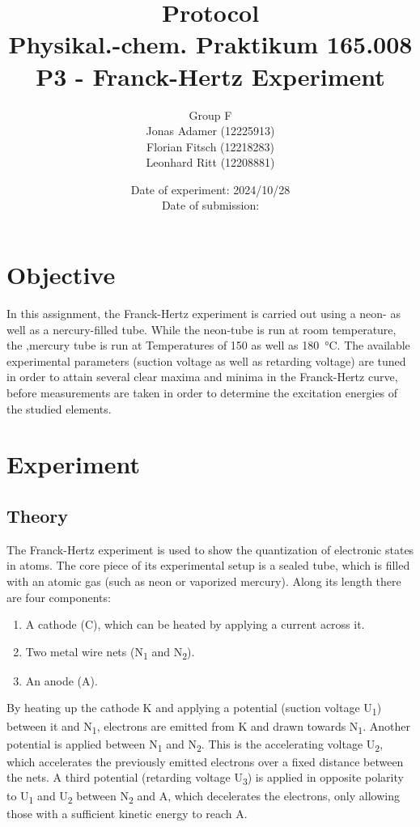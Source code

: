 \documentclass[titlepage]{article}
\title{Protocol \\ Physikal.-chem. Praktikum 165.008 \\ P3 - Franck-Hertz Experiment}
\author{Group F\\Jonas Adamer (12225913)\\Florian Fitsch (12218283)\\Leonhard Ritt (12208881)}
\date{Date of experiment: 2024/10/28\\Date of submission:}
\begin{document}
\maketitle
\thispagestyle{empty}

\newpage
\tableofcontents
\thispagestyle{empty}

\addtocounter{page}{-1}

\newpage
\section{Objective}
In this assignment, the Franck-Hertz experiment is carried out using a neon- as well as a nercury-filled tube. While the neon-tube is run at room temperature, the ,mercury tube is run at Temperatures of 150 as well as 180~°C. The available experimental parameters (suction voltage as well as retarding voltage) are tuned in order to attain several clear maxima and minima in the Franck-Hertz curve, before measurements are taken in order to determine the excitation energies of the studied elements.

\section{Experiment}
\subsection{Theory}
The Franck-Hertz experiment is used to show the quantization of electronic states in atoms. The core piece of its experimental setup is a sealed tube, which is filled with an atomic gas (such as neon or vaporized mercury). Along its length there are four components:
%
\begin{enumerate}
    \itemsep0em
    \item A cathode (C), which can be heated by applying a current across it.
    \item Two metal wire nets (N\textsubscript{1} and N\textsubscript{2}).
    \item An anode (A).
\end{enumerate}

By heating up the cathode K and applying a potential (suction voltage U\textsubscript{1}) between it and N\textsubscript{1}, electrons are emitted from K and drawn towards N\textsubscript{1}. Another potential is applied between N\textsubscript{1} and N\textsubscript{2}. This is the accelerating voltage U\textsubscript{2}, which accelerates the previously emitted electrons over a fixed distance between the nets. A third potential (retarding voltage U\textsubscript{3}) is applied in opposite polarity to U\textsubscript{1} and U\textsubscript{2} between N\textsubscript{2} and A, which decelerates the electrons, only allowing those with a sufficient kinetic energy to reach A.
\end{document}

